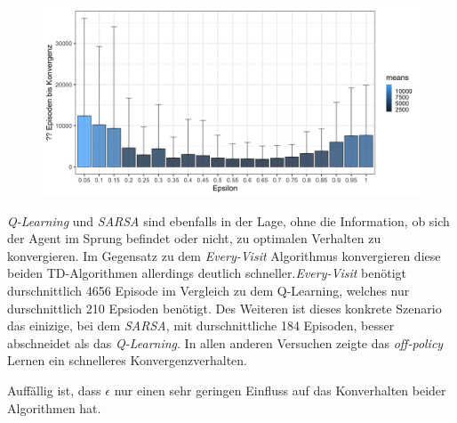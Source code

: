 \begin{figure}[H]
  \centering
  \includegraphics[width=\textwidth]{images/SimpleNoJumpEveryVisitMCA}
  \label{fig:test1}
\end{figure}
 
\textit{Q-Learning} und \textit{SARSA} sind ebenfalls in der Lage, ohne die Information, ob sich der Agent im Sprung befindet oder nicht, zu optimalen Verhalten zu konvergieren. Im Gegensatz zu dem \textit{Every-Visit} Algorithmus konvergieren diese beiden TD-Algorithmen allerdings deutlich schneller.\textit{Every-Visit} benötigt durschnittlich 4656 Episode im Vergleich zu dem {Q-Learning}, welches nur durschnittlich 210 Epsioden benötigt. Des Weiteren ist dieses konkrete Szenario das einizige, bei dem \textit{SARSA}, mit durschnittliche 184 Episoden, besser abschneidet als das \textit{Q-Learning}. In allen anderen Versuchen zeigte das \textit{off-policy} Lernen ein schnelleres Konvergenzverhalten.
\par 
Auffällig ist, dass $\epsilon$ nur einen sehr geringen Einfluss auf das Konverhalten beider Algorithmen hat. 

